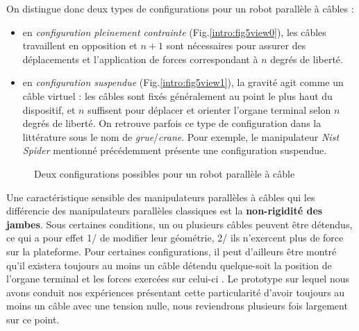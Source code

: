 On distingue donc deux types de configurations pour un robot parallèle à câbles :
\begin{itemize}
 \item en {\it configuration pleinement contrainte} (Fig.\ref{intro:fig5view0}), les câbles travaillent en opposition et $n+1$ sont nécessaires pour assurer des déplacements et l'application de forces correspondant à $n$ degrés de liberté.
 \item en {\it configuration suspendue} (Fig.\ref{intro:fig5view1}), la gravité agit comme un câble virtuel : les câbles sont fixés généralement au point le plus haut du dispositif, et $n$ suffisent pour déplacer et orienter l'organe terminal selon $n$ degrés de liberté. On retrouve parfois ce type de configuration dans la littérature sous le nom de {\it grue}/{\it crane}. Pour exemple, le manipulateur {\it Nist Spider} \cite{1992:Albus.Bostelman.ea} mentionné précédemment présente une configuration suspendue.
\end{itemize}

\begin{figure}[!ht]
  \centering
      \hfill
    \caption{\footnotesize Deux configurations possibles pour un robot parallèle à câble}
\label{intro:fig5}
\end{figure}

Une caractéristique sensible des manipulateurs parallèles à câbles qui les différencie des manipulateurs parallèles classiques est la {\bf non-rigidité des jam\-bes}. Sous certaines conditions, un ou plusieurs câbles peuvent être détendus, ce qui a pour effet 1/ de modifier leur géométrie, 2/ ils n'exercent plus de force sur la plateforme. Pour certaines configurations, il peut d'ailleurs être montré qu'il existera toujours au moins un câble détendu quelque-soit la position de l'organe terminal et les forces exercées sur celui-ci \cite{2011:Carricato.Merlet}. Le prototype sur lequel nous avons conduit nos expériences présentant cette particularité d'avoir toujours au moins un câble avec une tension nulle, nous reviendrons plusieurs fois largement sur ce point.

